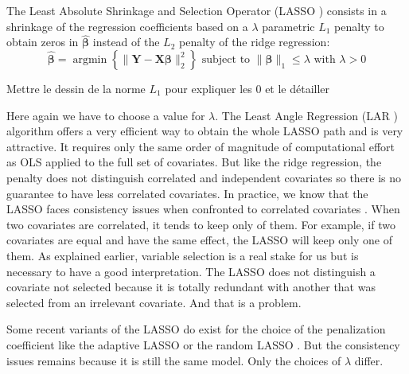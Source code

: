 \documentclass[12pt,a4paper]{report}
\begin{document}
The Least Absolute Shrinkage and Selection Operator (\textsc{LASSO} \cite{tibshirani1996regression,tibshiranilasso}) consists in a shrinkage of the regression coefficients based on a $\lambda$ parametric $L_1$ penalty to obtain zeros in $\hat{\boldsymbol{\beta}}$ instead of the $L_2$ penalty of the ridge regression:
		\begin{equation}
		 \boldsymbol{\hat{\beta}}=\operatorname{argmin} \left\lbrace \parallel \boldsymbol{Y}-\boldsymbol{X\beta}\parallel_2^2 \right\rbrace \textrm{ subject to } \parallel\boldsymbol{\beta} \parallel_1\leq \lambda \textrm{ with } \lambda>0
		\end{equation}	
		
		
Mettre le dessin de la norme $L_1$ pour expliquer les 0 et le détailler		
		
		Here again we have to choose a value for $\lambda$.
	 The Least Angle Regression (\textsc{LAR} \cite{efron2004least}) algorithm offers a very efficient way to obtain the whole LASSO path and is very attractive. It requires only the same order of magnitude of computational effort as \textsc{OLS} applied to the full set of covariates. But like the ridge regression, the penalty does not distinguish correlated and independent covariates so there is no guarantee to have less correlated covariates. In practice, we know that the LASSO faces consistency issues when confronted to correlated covariates \cite{Zhao2006MSC}. When two covariates are correlated, it tends to keep only of them. For example, if two covariates are equal and have the same effect, the LASSO will keep only one of them. As explained earlier, variable selection is a real stake for us but is necessary to have a good interpretation. The LASSO does not distinguish a covariate not selected because it is totally redundant with another that was selected from an irrelevant covariate. And that is a problem.



			 Some recent variants of the \textsc{LASSO} do exist for the choice of the penalization coefficient like the adaptive \textsc{LASSO} \cite{zou2006adaptive} or the random \textsc{LASSO} \cite{wang2011random}.  But the consistency issues remains because it is still the same model. Only the choices of $\lambda$ differ.
			 
\end{document}
